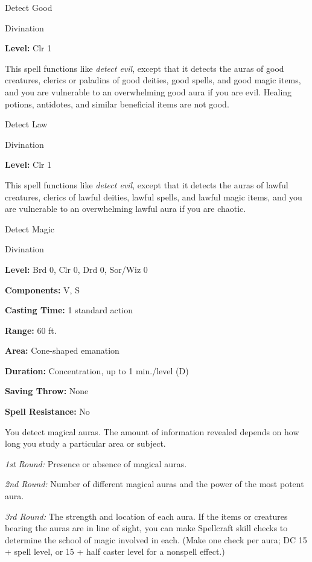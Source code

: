 \documentclass{article}
\begin{document}
\vspace{12pt}
Detect Good

Divination

\textbf{Level:} Clr 1

This spell functions like \textit{detect evil}, except that it detects the auras 
of good creatures, clerics or paladins of good deities, good spells, and good magic 
items, and you are vulnerable to an overwhelming good aura if you are evil. Healing 
potions, antidotes, and similar beneficial items are not good.

\vspace{12pt}
Detect Law

Divination

\textbf{Level:} Clr 1

This spell functions like \textit{detect evil}, except that it detects the auras 
of lawful creatures, clerics of lawful deities, lawful spells, and lawful magic 
items, and you are vulnerable to an overwhelming lawful aura if you are chaotic.

\vspace{12pt}
Detect Magic

Divination

\textbf{Level:} Brd 0, Clr 0, Drd 0, Sor/Wiz 0

\textbf{Components:} V, S

\textbf{Casting Time:} 1 standard action

\textbf{Range:} 60 ft.

\textbf{Area:} Cone-shaped emanation

\textbf{Duration:} Concentration, up to 1 min./level (D)

\textbf{Saving Throw:} None

\textbf{Spell Resistance:} No

You detect magical auras. The amount of information revealed depends on how long 
you study a particular area or subject.

\textit{1st Round: }Presence or absence of magical auras.

\textit{2nd Round: }Number of different magical auras and the power of the most 
potent aura.

\textit{3rd Round: }The strength and location of each aura. If the items or creatures 
bearing the auras are in line of sight, you can make Spellcraft skill checks to 
determine the school of magic involved in each. (Make one check per aura; DC 15 
+ spell level, or 15 + half caster level for a nonspell effect.)
\end{document}
